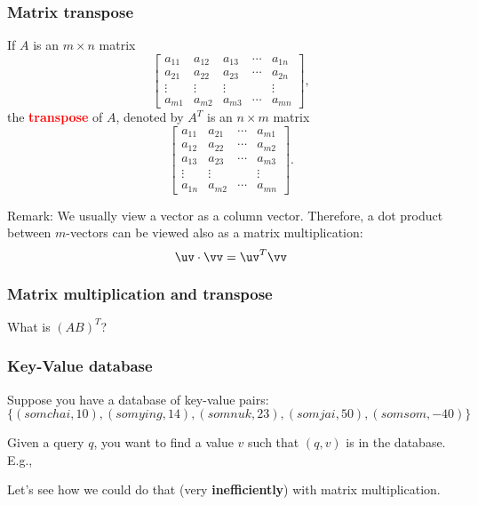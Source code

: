 \begin{frame}
  \frametitle{Matrix transpose}

  If $A$ is an $m\times n$ matrix
  {\footnotesize
  \[
  \left[
  \begin{array}{ccccc}
    a_{11} & a_{12} & a_{13} & \cdots & a_{1n} \\
    a_{21} & a_{22} & a_{23} & \cdots & a_{2n} \\
    \vdots & \vdots & \vdots & & \vdots \\
    a_{m1} & a_{m2} & a_{m3} & \cdots & a_{mn}
  \end{array}
  \right],
  \]
  }
  the \textcolor{red}{\bf transpose} of $A$, denoted by $A^{T}$ is
  an $n\times m$ matrix {\footnotesize
  \[
  \left[
  \begin{array}{cccc}
    a_{11} & a_{21} & \cdots & a_{m1} \\
    a_{12} & a_{22} & \cdots & a_{m2} \\
    a_{13} & a_{23} & \cdots & a_{m3} \\
    \vdots & \vdots & & \vdots \\
    a_{1n} & a_{m2} & \cdots & a_{mn}
  \end{array}
  \right].
  \]
  }
  \vspace{0.1in}

  \pause

  {\small
    Remark: We usually view a vector as a column vector.
    Therefore, a dot product between $m$-vectors can be viewed also as
    a matrix multiplication:
  \[
  \uv\cdot\vv = \uv^T\vv
  \]
  }
\end{frame}

\begin{frame}
  \frametitle{Matrix multiplication and transpose}
  What is $(AB)^T$?
  \vspace{2.5in}
\end{frame}

\begin{frame}
  \frametitle{Key-Value database}

  Suppose you have a database of key-value pairs:
  \[
  \{(somchai,10), (somying,14), (somnuk,23), (somjai,50), (somsom,-40)\}
  \]
  
  Given a query $q$, you want to find a value $v$ such that $(q,v)$ is
  in the database.  E.g., \pause

  Let's see how we could do that (very {\bf inefficiently}) with
  matrix multiplication.

  \vspace{2in}
  
\end{frame}

